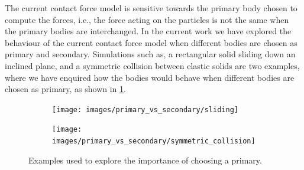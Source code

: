 \documentclass[preprint,12pt]{elsarticle}
\newcommand{\todoin}{\todo[inline]}
\newcommand{\ten}[1]{\ensuremath{\mathbf{#1}}}
\begin{document}

The current contact force model is sensitive towards the primary body chosen
to compute the forces, i.e., the force acting on the particles is not the same
when the primary bodies are interchanged. In the current work we have explored
the behaviour of the current contact force model when different bodies are
chosen as primary and secondary. Simulations such as, a rectangular solid
sliding down an inclined plane, and a symmetric collision between elastic
solids are two examples, where we have enquired how the bodies would behave
when different bodies are chosen as primary, as shown in
\cref{fig:primary-secondary-demonstration}.
\begin{figure}[!htpb]
  \centering
  \begin{subfigure}{0.48\textwidth}
    \centering
    \texttt{[image: images/primary\_vs\_secondary/sliding]}
  \end{subfigure}
  \begin{subfigure}{0.48\textwidth}
    \centering
    \texttt{[image: images/primary\_vs\_secondary/symmetric\_collision]}
  \end{subfigure}
  \caption{Examples used to explore the importance of choosing a primary.}
\label{fig:primary-secondary-demonstration}
\end{figure}



\newpage
~\newpage

\end{document}
